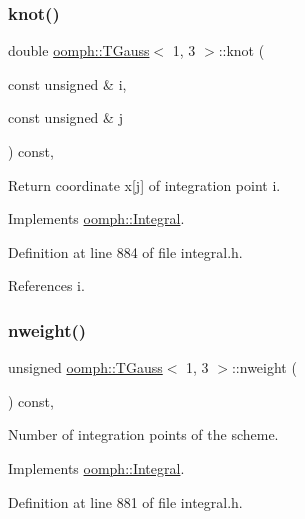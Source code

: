 \subsubsection{\texorpdfstring{knot()}{knot()}}
{\footnotesize\ttfamily double \hyperlink{classoomph_1_1TGauss}{oomph\+::\+T\+Gauss}$<$ 1, 3 $>$\+::knot (\begin{DoxyParamCaption}\item[{const unsigned \&}]{i,  }\item[{const unsigned \&}]{j }\end{DoxyParamCaption}) const\hspace{0.3cm}{\ttfamily [inline]}, {\ttfamily [virtual]}}



Return coordinate x\mbox{[}j\mbox{]} of integration point i. 



Implements \hyperlink{classoomph_1_1Integral_a1a2122f99a87c18649bafdd9ed739758}{oomph\+::\+Integral}.



Definition at line 884 of file integral.\+h.



References i.

\mbox{\label{classoomph_1_1TGauss_3_011_00_013_01_4_ad6876956df22bbe22cba0f3932cfc807}} 
\subsubsection{\texorpdfstring{nweight()}{nweight()}}
{\footnotesize\ttfamily unsigned \hyperlink{classoomph_1_1TGauss}{oomph\+::\+T\+Gauss}$<$ 1, 3 $>$\+::nweight (\begin{DoxyParamCaption}{ }\end{DoxyParamCaption}) const\hspace{0.3cm}{\ttfamily [inline]}, {\ttfamily [virtual]}}



Number of integration points of the scheme. 



Implements \hyperlink{classoomph_1_1Integral_a1a270de9d99a1fcf1d25a6c1017f65fa}{oomph\+::\+Integral}.



Definition at line 881 of file integral.\+h.


